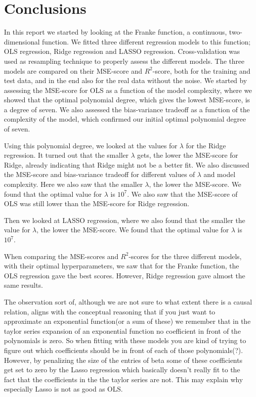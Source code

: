 \documentclass[12pt]{extarticle}
\begin{document}
\section{Conclusions}

In this report we started by looking at the Franke function, a continuous, two-dimensional function. We fitted three different regression models to this function; OLS regression, Ridge regression and LASSO regression. Cross-validation was used as resampling technique to properly assess the different models. The three models are compared on their MSE-score and $R^2$-score, both for the training and test data, and in the end also for the real data without the noise. We started by assessing the MSE-score for OLS as a function of the model complexity, where we showed that the optimal polynomial degree, which gives the lowest MSE-score, is a degree of seven. We also assessed the bias-variance tradeoff as a function of the complexity of the model, which confirmed our initial optimal polynomial degree of seven. 

Using this polynomial degree, we looked at the values for $\lambda$ for the Ridge regression. It turned out that the smaller $\lambda$ gets, the lower the MSE-score for Ridge, already indicating that Ridge might not be a better fit. We also discussed the MSE-score and bias-variance tradeoff for different values of $\lambda$ and model complexity. Here we also saw that the smaller $\lambda$, the lower the MSE-score. We found that the optimal value for $\lambda$ is $10^{7}$. We also saw that the MSE-score of OLS was still lower than the MSE-score for Ridge regression. 

Then we looked at LASSO regression, where we also found that the smaller the value for $\lambda$, the lower the MSE-score. We found that the optimal value for $\lambda$ is $10^{7}$. 

When comparing the MSE-scores and $R^2$-scores for the three different models, with their optimal hyperparameters, we saw that for the Franke function, the OLS regression gave the best scores. However, Ridge regression gave almost the same results.

The observation sort of, although we are not sure to what extent there is a causal relation, aligns with the conceptual reasoning that if you just want to approximate an exponential function(or a sum of these) we remember that in the taylor series expansion of an exponential function no coefficient in front of the polynomials is zero. So when fitting with these models you are kind of trying to figure out which coefficients should be in front of each of those polynomials(?). However, by penalizing the size of the entries of beta some of these coefficients get set to zero by the Lasso regression which basically doesn't really fit to the fact that the coefficients in the the taylor series are not. This may explain why especially Lasso is not as good as OLS.
\end{document}
